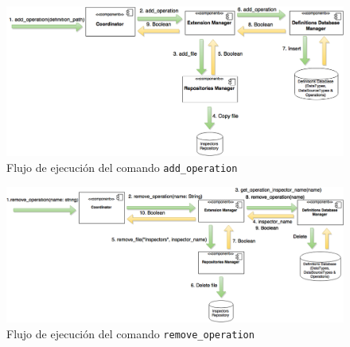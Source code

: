 \begin{figure}[H]
    \begin{center}
        \includegraphics[width=\textwidth]{figures/add_operation}
        \caption{Flujo de ejecución del comando \texttt{add\_operation}}
    \end{center}
\end{figure}

\begin{figure}[H]
    \begin{center}
        \includegraphics[width=\textwidth]{figures/remove_operation}
        \caption{Flujo de ejecución del comando \texttt{remove\_operation}}
    \end{center}
\end{figure}
